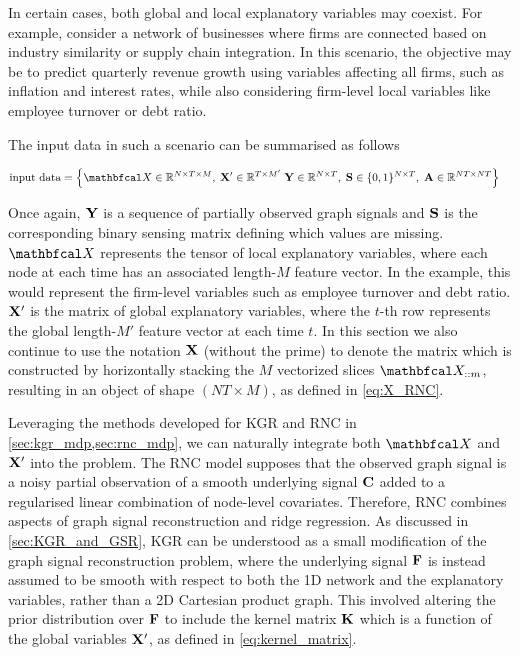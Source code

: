 In certain cases, both global and local explanatory variables may coexist. For example, consider a network of businesses where firms are connected based on industry similarity or supply chain integration. In this scenario, the objective may be to predict quarterly revenue growth using variables affecting all firms, such as inflation and interest rates, while also considering firm-level local variables like employee turnover or debt ratio.

The input data in such a scenario can be summarised as follows

\begin{align*}
    \text{input data} &= \left\{\Xt \in \R^{N \times T \times M}, \; \X' \in \R^{T \times M'} \; \Y \in \R^{N \times T}, \; \Ss \in \{0, 1\}^{N \times T}, \; \A \in \R^{NT \times NT} \right\}
\end{align*}

Once again, $\mathbf{Y}$ is a sequence of partially observed graph signals and $\mathbf{S}$ is the corresponding binary sensing matrix defining which values are missing. $\Xt$ represents the tensor of local explanatory variables, where each node at each time has an associated length-$M$ feature vector. In the example, this would represent the firm-level variables such as employee turnover and debt ratio. $\mathbf{X}'$ is the matrix of global explanatory variables, where the $t$-th row represents the global length-$M'$ feature vector at each time $t$. In this section we also continue to use the notation $\mathbf{X}$ (without the prime) to denote the matrix which is constructed by horizontally stacking the $M$ vectorized slices $\Xt_{::m}$, resulting in an object of shape $(NT \times M)$, as defined in \cref{eq:X_RNC}. 

Leveraging the methods developed for KGR and RNC in \cref{sec:kgr_mdp,sec:rnc_mdp}, we can naturally integrate both $\Xt$ and $\mathbf{X}'$ into the problem. The RNC model supposes that the observed graph signal is a noisy partial observation of a smooth underlying signal $\mathbf{C}$ added to a regularised linear combination of node-level covariates. Therefore, RNC combines aspects of graph signal reconstruction and ridge regression. As discussed in \cref{sec:KGR_and_GSR}, KGR can be understood as a small modification of the graph signal reconstruction problem, where the underlying signal $\mathbf{F}$ is instead assumed to be smooth with respect to both the 1D network and the explanatory variables, rather than a 2D Cartesian product graph. This involved altering the prior distribution over $\mathbf{F}$ to include the kernel matrix $\mathbf{K}$ which is a function of the global variables $\mathbf{X}'$, as defined in \cref{eq:kernel_matrix}. 

